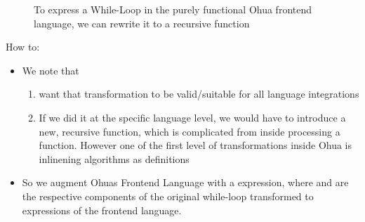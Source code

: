 \begin{figure}[H]
\centering
\tabskip=0pt
\caption{To express a While-Loop in the purely functional Ohua frontend language, we can rewrite it to a recursive function}
\label{fig:WhileTransform}
\end{figure}

How to:
\begin{itemize}
    \item We note that 
    \begin{enumerate}
        \item want that transformation to be valid/suitable for all language integrations
        \item If we did it at the specific language level, we would have to introduce a new, recursive function, which is complicated from inside processing a function. However one of the first level of transformations inside Ohua is inlinening algorithms as  definitions  
    \end{enumerate}
    \item So we augment Ohuas Frontend Language with a  expression, where  and  are the respective components of the original while-loop transformed to expressions of the frontend language.
\end{itemize}

